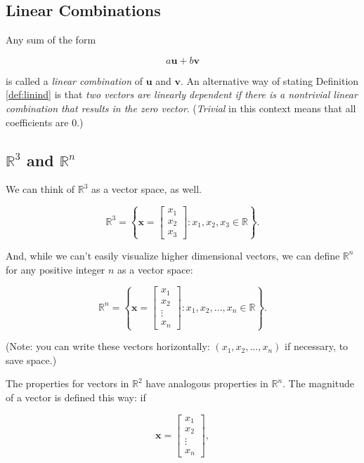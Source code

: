 \documentclass[
]{book}
\theoremstyle{definition}
\theoremstyle{definition}
\theoremstyle{definition}
\theoremstyle{definition}
\theoremstyle{remark}
\begin{document}
\subsection*{Linear Combinations}\label{linear-combinations}

Any sum of the form

\[a\mathbf{u}+b\mathbf{v}\]

is called a \emph{linear combination} of \(\mathbf{u}\) and \(\mathbf{v}\). An alternative way of stating Definition \ref{def:linind} is that \emph{two vectors are linearly dependent if there is a nontrivial linear combination that results in the zero vector}. (\emph{Trivial} in this context means that all coefficients are 0.)

\subsection*{\texorpdfstring{\(\mathbb{R}^3\) and \(\mathbb{R}^n\)}{\textbackslash mathbb\{R\}\^{}3 and \textbackslash mathbb\{R\}\^{}n}}\label{mathbbr3-and-mathbbrn}

We can think of \(\mathbb{R}^3\) as a vector space, as well.

\[\mathbb{R}^3=\left\{\mathbf{x}=\begin{bmatrix}x_1\\x_2\\x_3\end{bmatrix}:x_1,x_2,x_3\in\mathbb{R}\right\}.\]

And, while we can't easily visualize higher dimensional vectors,
we can define \(\mathbb{R}^n\) for any positive integer \(n\) as a vector space:

\[\mathbb{R}^n=\left\{\mathbf{x}=\begin{bmatrix}x_1\\x_2\\ \vdots \\x_n\end{bmatrix}: x_1,x_2,\dots, x_n\in\mathbb{R}\right\}.\]

(Note: you can write these vectors horizontally: \((x_1,x_2,\dots,x_n)\) if necessary, to save space.)

The properties for vectors in \(\mathbb{R}^2\) have analogous properties in \(\mathbb{R}^n\). The magnitude of a vector is defined this way: if

\[\mathbf{x}=\begin{bmatrix}x_1\\x_2\\ \vdots \\x_n\end{bmatrix},\]
\end{document}
